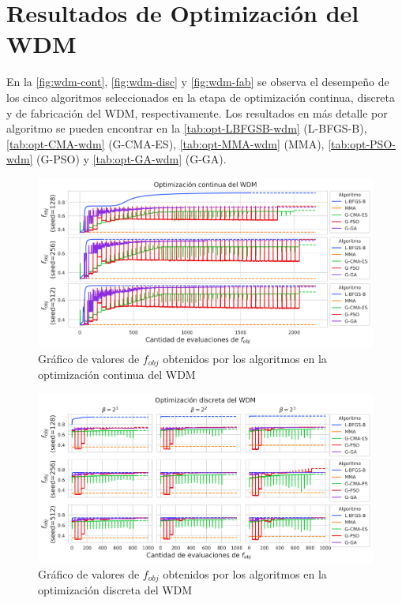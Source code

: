 \section{Resultados de Optimización del WDM}\label{sec:results-wdm}

En la \autoref{fig:wdm-cont}, \autoref{fig:wdm-disc} y \autoref{fig:wdm-fab} se observa 
el desempeño de los cinco algoritmos seleccionados en la etapa de optimización continua, discreta y
de fabricación del WDM, respectivamente.
Los resultados en más detalle por algoritmo se pueden encontrar en la
\autoref{tab:opt-LBFGSB-wdm} (L-BFGS-B),
\autoref{tab:opt-CMA-wdm} (G-CMA-ES),
\autoref{tab:opt-MMA-wdm} (MMA),
\autoref{tab:opt-PSO-wdm} (G-PSO) y
\autoref{tab:opt-GA-wdm} (G-GA).

\begin{landscape}
\begin{figure}[ht]
  \centering
  \includegraphics[scale=1.0]{image/results/wdm/wdm-opt-cont.png}
  \caption{Gráfico de valores de $f_{obj}$ obtenidos por los algoritmos en la optimización continua del WDM}
  \label{fig:wdm-cont}
\end{figure}
\end{landscape}

\begin{landscape}
\begin{figure}[ht]
  \centering
  \includegraphics[scale=1.0]{image/results/wdm/wdm-opt-disc.png}
  \caption{Gráfico de valores de $f_{obj}$ obtenidos por los algoritmos en la optimización discreta del WDM}
  \label{fig:wdm-disc}
\end{figure}
\end{landscape}

